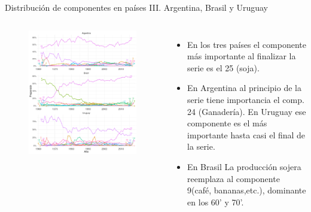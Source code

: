 \documentclass[compress]{beamer}
\begin{document}
\begin{frame}
\small
Distribución de componentes en países III. Argentina, Brasil y Uruguay
\scriptsize
\begin{columns}[c] 
	
	\begin{figure}
		\includegraphics[width=\linewidth]{graficoLDA_k30_ARG_BRA_URY}
	\end{figure}
	
	
	\begin{itemize}[label=\faRebel]
		\item En los tres países el componente más importante al finalizar la serie es el 25 (soja).
		\item En Argentina al principio de la serie tiene importancia el comp. 24 (Ganadería). En Uruguay ese componente es el más importante hasta casi el final de la serie.
		\item En Brasil La producción sojera reemplaza al componente 9(café, bananas,etc.), dominante en los 60' y 70'.
	\end{itemize}
	
\end{columns} 

\end{frame}
\end{document}
